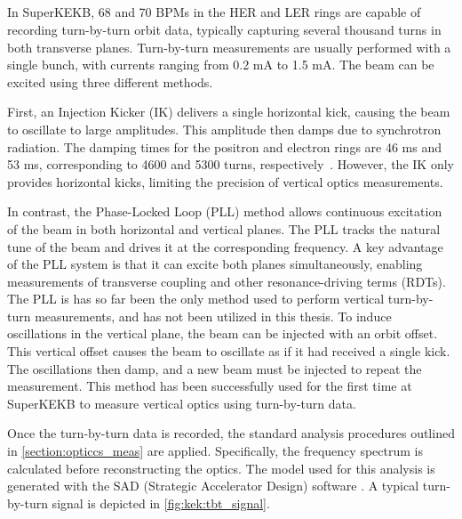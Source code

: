 \FloatBarrier
\subsection{}

In SuperKEKB, 68 and 70 BPMs in the HER and LER rings are capable of recording turn-by-turn orbit
data, typically capturing several thousand turns in both transverse planes. Turn-by-turn
measurements are usually performed with a single bunch, with currents ranging from 0.2 mA to 1.5 mA.
The beam can be excited using three different methods.

First, an Injection Kicker (IK) delivers a single horizontal kick, causing the beam to oscillate to
large amplitudes. This amplitude then damps due to synchrotron radiation. The damping times for the
positron and electron rings are 46 ms and 53 ms, corresponding to 4600 and 5300 turns,
respectively~\cite{keintzel_jacqueline_beam_2022}. However, the IK only provides horizontal kicks,
limiting the precision of vertical optics measurements.

In contrast, the Phase-Locked Loop (PLL) method allows continuous excitation of the beam in both
horizontal and vertical planes. The PLL tracks the natural tune of the beam and drives it at the
corresponding frequency. A key advantage of the PLL system is that it can excite both planes
simultaneously, enabling measurements of transverse coupling and other resonance-driving terms
(RDTs). The PLL is has so far been the only method used to perform vertical turn-by-turn
measurements, and has not been utilized in this thesis.
To induce oscillations in the vertical plane, the beam can be injected with an orbit offset. This
vertical offset causes the beam to oscillate as if it had received a single kick. The oscillations
then damp, and a new beam must be injected to repeat the measurement. This method has been
successfully used for the first time at SuperKEKB to measure vertical optics using turn-by-turn
data.

Once the turn-by-turn data is recorded, the standard analysis procedures outlined in
\cref{section:opticcs_meas} are applied. Specifically, the frequency spectrum is calculated before
reconstructing the optics. The model used for this analysis is generated with the SAD (Strategic
Accelerator Design) software \cite{noauthor_sad_nodate}.
A typical turn-by-turn signal is depicted in \cref{fig:kek:tbt_signal}.


